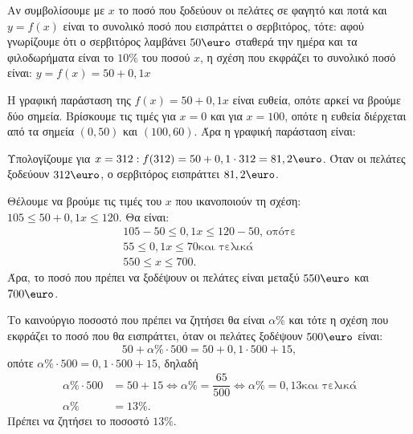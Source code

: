 
\begin{alist}
\item Αν συμβολίσουμε με $x$ το ποσό που ξοδεύουν οι πελάτες σε φαγητό και ποτά και $y = f(x)$ είναι το συνολικό ποσό που εισπράττει ο σερβιτόρος, τότε: αφού γνωρίζουμε ότι ο σερβιτόρος λαμβάνει $50\text{\euro}$ σταθερά την ημέρα και τα φιλοδωρήματα είναι το $10\%$ του ποσού $x$, η σχέση που εκφράζει το συνολικό ποσό είναι:
$y = f(x) = 50 + 0,1x$

\item Η γραφική παράσταση της $f(x) = 50 + 0,1x$ είναι ευθεία, οπότε αρκεί να βρούμε δύο σημεία. Βρίσκουμε τις τιμές για $x = 0$ και για $x = 100$, οπότε η ευθεία διέρχεται από τα σημεία $(0, 50)$ και $(100, 60)$. Άρα η γραφική παράσταση είναι:


\item
\begin{rlist}
\item Υπολογίζουμε για $x = 312: f(312) = 50 + 0,1 \cdot 312 = 81,2\text{\euro}$. Όταν οι πελάτες ξοδεύουν $312\text{\euro}$, ο σερβιτόρος εισπράττει $81,2\text{\euro}$.

\item Θέλουμε να βρούμε τις τιμές του $x$ που ικανοποιούν τη σχέση:
$105 \le 50 + 0,1x \le 120$.
Θα είναι:
\begin{gather*}
105 - 50 \le 0,1x \le 120 - 50\text{, οπότε} \\
55 \le 0,1x \le 70\text{και τελικά} \\
550 \le x \le 700.
\end{gather*}
Άρα, το ποσό που πρέπει να ξοδέψουν οι πελάτες είναι μεταξύ $550\text{\euro}$ και $700\text{\euro}$.
\end{rlist}

\item Το καινούργιο ποσοστό που πρέπει να ζητήσει θα είναι $\alpha\%$ και τότε η σχέση που εκφράζει το ποσό που θα εισπράττει, όταν οι πελάτες ξοδέψουν $500\text{\euro}$ είναι:
\[50 + \alpha\% \cdot 500 = 50 + 0,1 \cdot 500 + 15,\]
οπότε $\alpha\% \cdot 500 = 0,1 \cdot 500 + 15$, δηλαδή
\begin{align*}
\alpha\% \cdot 500 &= 50 + 15 \Leftrightarrow \alpha\% = \dfrac{65}{500} \Leftrightarrow \alpha\% = 0,13\text{και τελικά} \\
\alpha\% &= 13\%.
\end{align*}
Πρέπει να ζητήσει το ποσοστό $13\%$.
\end{alist}

